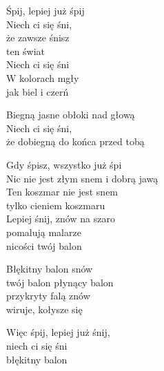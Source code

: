 \begin{text}
    Śpij, lepiej już śpij\\
    Niech ci się śni,\\
    że zawsze śnisz\\
    ten świat\\
    Niech ci się śni\\
    W kolorach mgły\\
    jak biel i czerń

    Biegną jasne obłoki nad głową\\
    Niech ci się śni,\\
    że dobiegną do końca przed tobą

    Gdy śpisz, wszystko już śpi\\
    Nic nie jest złym snem i dobrą jawą\\
    Ten koszmar nie jest snem\\
    tylko cieniem koszmaru\\
    Lepiej śnij, znów na szaro\\
    pomalują malarze\\
    nicości twój balon

    Błękitny balon snów\\
    twój balon płynący balon\\
    przykryty falą znów\\
    wiruje, kołysze się

    Więc śpij, lepiej już śnij,\\
    niech ci się śni\\
    błękitny balon
\end{text}
\begin{chord}

\end{chord}